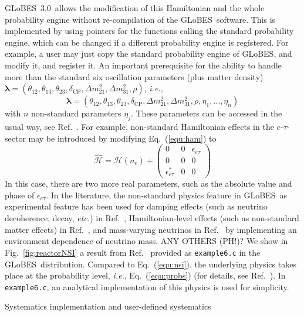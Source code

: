 \documentclass[12pt,a4paper]{article}
\makeatletter
\renewcommand{\section}{\@startsection{section}{1}{0em}{-\baselineskip}%
{\baselineskip}{\normalfont\large\bfseries}}
\newcommand{\ie}{{\it i.e.}}
\newcommand{\etc}{{\it etc.}}
\newcommand{\eq}{Eq.}
\newcommand{\fig}{Fig.}
\newcommand{\Ref}{Ref.}
\newcommand{\ldm}{\Delta m_{31}^2}
\newcommand{\sdm}{\Delta m_{21}^2}
\newcommand{\deltacp}{\delta_{\mathrm{CP}}}
\newcommand{\GLOBES}{{\sf GLoBES}}
\newcommand{\GLOBESN}{{\sf GLoBES~3.0}}
\newcommand{\equ}[1]{\eq~(\ref{equ:#1})}
\newcommand{\figu}[1]{\fig~\ref{fig:#1}}
\makeatother
\begin{document}
\GLOBESN\ allows the modification of this Hamiltonian and the whole probability engine without
re-compilation of the \GLOBES\ software. This is implemented
by using pointers for the functions calling the standard probability engine, which can be changed if
a different probability engine is registered. For example, a user may just copy the standard probability
engine of \GLOBES , and modify it, and register it. An important prerequisite for the ability to handle
more than the standard six oscillation parameters (plus matter density) $\boldsymbol{\lambda}=(\theta_{12},\theta_{13}, \theta_{23}, \deltacp, \sdm, \ldm, \rho)$, \ie,
\begin{equation}
\boldsymbol{\lambda}=(\theta_{12},\theta_{13}, \theta_{23}, \deltacp, \sdm, \ldm, \rho, \eta_1, \hdots, \eta_n)
\end{equation}
with $n$ non-standard parameters $\eta_j$. These parameters can be accessed in the usual way, see \Ref~\cite{Manual}.
For example, non-standard Hamiltonian effects in the $e$-$\tau$-sector may be introduced by modifying \equ{ham} to
\begin{equation}
 \mathcal{\hat{H}} = \mathcal{H}(n_e) + 
\left(
\begin{array}{ccc}
0 & 0 & \epsilon_{e \tau} \\
0 & 0 & 0 \\
\epsilon_{e \tau}^* & 0 & 0 
\end{array}
\right)
\label{equ:nsi}
\end{equation}
In this case, there are two more real parameters, such as the absolute value and phase of $\epsilon_{e \tau}$.
In the literature, the non-standard physics feature in \GLOBES\ as experimental feature has been used for damping effects (such as neutrino decoherence, decay, \etc) in \Ref~\cite{Blennow:2005yk}, Hamiltonian-level effects (such as non-standard matter effects) in \Ref~\cite{Blennow:2005qj}, and mass-varying neutrinos in \Ref~\cite{Schwetz:2005fy} by implementing an environment dependence of neutrino mass.  ANY OTHERS (PH!)?
We show in \figu{reactorNSI} a result from \Ref~\cite{Blennow:2005yk} provided as {\tt example6.c} in the \GLOBES\
distribution. Compared to \equ{nsi}, the underlying physics takes place at the probability level, \ie, 
\equ{probs} (for details, see \Ref~\cite{Blennow:2005yk}). In {\tt example6.c}, an analytical implementation
of this physics is used for simplicity.

\section{Systematics implementation and user-defined systematics}
\end{document}
